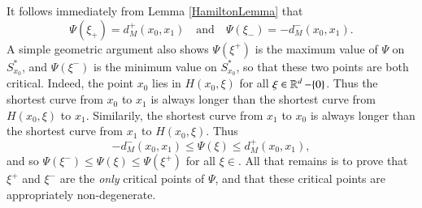 %






It follows immediately from Lemma \ref{HamiltonLemma} that
%
\begin{equation}
    \Psi(\xi_+) = d_M^+(x_0,x_1) \quad\text{and}\quad \Psi(\xi_-) = - d_M^-(x_0,x_1).
\end{equation}
%
A simple geometric argument also shows $\Psi(\xi^+)$ is the maximum value of $\Psi$ on $S_{x_0}^*$, and $\Psi(\xi^-)$ is the minimum value on $S_{x_0}^*$, so that these two points are both critical. Indeed, the point $x_0$ lies in $H(x_0,\xi)$ for all $\xi \in \operatorname{\mathbb{R}}^d - \{ 0 \}$. Thus the shortest curve from $x_0$ to $x_1$ is always longer than the shortest curve from $H(x_0,\xi)$ to $x_1$. Similarily, the shortest curve from $x_1$ to $x_0$ is always longer than the shortest curve from $x_1$ to $H(x_0,\xi)$. Thus
%
\begin{equation}
    - d_M^-(x_0,x_1) \leq \Psi(\xi) \leq d_M^+(x_0,x_1),
\end{equation}
%
and so $\Psi(\xi^-) \leq \Psi(\xi) \leq \Psi(\xi^+)$ for all $\xi \in $. All that remains is to prove that $\xi^+$ and $\xi^-$ are the \emph{only} critical points of $\Psi$, and that these critical points are appropriately non-degenerate.

